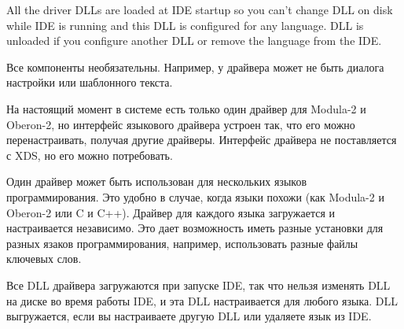 All the driver DLLs are loaded at IDE startup so you can't change DLL on disk
while IDE is running and this DLL is configured for any language. DLL is unloaded if
you configure another DLL or remove the language from the IDE.

\else
Все компоненты необязательны. Например, у драйвера может не быть диалога 
настройки или шаблонного текста.

На настоящий момент в системе есть только один драйвер для Modula-2 и Oberon-2,
но интерфейс языкового драйвера устроен так, что его можно перенастраивать,
получая другие драйверы. Интерфейс драйвера не поставляется с XDS, но его 
можно потребовать.
 
Один драйвер может быть использован для нескольких языков программирования.
Это удобно в случае, когда языки похожи (как Modula-2 и Oberon-2 или C и C++).
Драйвер для каждого языка загружается и настраивается независимо. Это дает 
возможность иметь разные установки для разных язаков программирования, например,
использовать разные файлы ключевых слов. 

Все DLL драйвера загружаются при запуске IDE, так что нельзя изменять DLL на 
диске во время работы IDE, и эта DLL настраивается для любого языка. DLL 
выгружается, если вы настраиваете другую DLL или удаляете язык из IDE.
\fi
